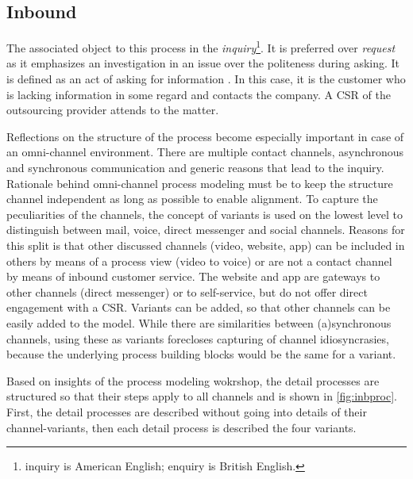 	 
	 
	 \subsection{Inbound}
	 The associated object to this process in the \textit{inquiry}\footnote{inquiry is American English; enquiry is British English.}. It is preferred over \textit{request} as it emphasizes an investigation in an issue over the politeness during asking. It is defined as an act of asking for information \citep{oxfordenquiry, oxfordrequest}. In this case, it is the customer who is lacking information in some regard and contacts the company. A \acrshort{CSR} of the outsourcing provider attends to the matter. 
	 
	 Reflections on the structure of the process become especially important in case of an omni-channel environment. There are multiple contact channels, asynchronous and synchronous communication and generic reasons that lead to the inquiry. Rationale behind omni-channel process modeling must be to keep the structure channel independent as long as possible to enable alignment. To capture the peculiarities of the channels, the concept of variants is used on the lowest level to distinguish between mail, voice, direct messenger and social channels. Reasons for this split is that other discussed channels (video, website, app) can be included in others by means of a process view (video to voice) or are not a contact channel by means of inbound customer service. The website and app are gateways to other channels (direct messenger) or to self-service, but do not offer direct engagement with a \acrshort{CSR}. Variants can be added, so that other channels can be easily added to the model. While there are similarities between (a)synchronous channels, using these as variants forecloses capturing of channel idiosyncrasies, because the underlying process building blocks would be the same for a variant. 
	 
	 Based on insights of the process modeling wokrshop, the detail processes are structured so that their steps apply to all channels and is shown in \Fig \ref{fig:inbproc}. First, the detail processes are described without going into details of their channel-variants, then each detail process is described \wrt the four variants. 
	 
